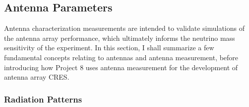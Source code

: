 \subsection{Antenna Parameters}
\label{sec:ant-meas-fun}

Antenna characterization measurements are intended to validate simulations of the antenna array performance, which ultimately informs the neutrino mass sensitivity of the experiment. In this section, I shall summarize a few fundamental concepts relating to antennas and antenna measurement, before introducing how Project 8 uses antenna measurement for the development of antenna array CRES.

\subsubsection{Radiation Patterns}

